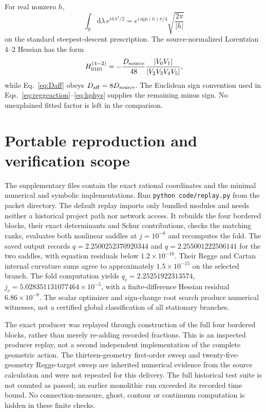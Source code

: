 \documentclass[11pt]{article}
\theoremstyle{definition}
\theoremstyle{remark}
\newcommand{\dd}{\mathrm d}
\begin{document}
For real nonzero $h$,
\begin{equation}
 \int_{\mathbb R}\dd\lambda\,e^{ih\lambda^2/2}
 =e^{i\,\mathrm{sgn}(h)\pi/4}\sqrt{\frac{2\pi}{|h|}}
\end{equation}
on the standard steepest-descent prescription.  The source-normalized Lorentzian $4$--$2$ Hessian has the form
\begin{equation}
 H_{0101}^{(4-2)}=-\frac{D_{\rm source}}{48}
 \frac{|V_0V_1|}{|V_2V_3V_4V_5|},
\end{equation}
while Eq.~\eqref{eq:Daff} obeys $D_{\rm aff}=8D_{\rm source}$.  The Euclidean sign convention used in Eqs.~\eqref{eq:reggeaction}--\eqref{eq:hphys} supplies the remaining minus sign.  No unexplained fitted factor is left in the comparison.

\section{Portable reproduction and verification scope}
The supplementary files contain the exact rational coordinates and the minimal numerical and symbolic implementations.
Run \texttt{python code/replay.py} from the packet directory.
The default replay imports only bundled modules and needs neither a historical project path nor network access.
It rebuilds the four bordered blocks, their exact determinants and Schur contributions, checks the matching ranks, evaluates both nonlinear saddles at $j=10^{-6}$ and recomputes the fold.
The saved output records $q=2.2500252370920344$ and $q=2.255001222506141$ for the two saddles, with equation residuals below $1.2\times10^{-16}$.
Their Regge and Cartan internal curvature sums agree to approximately $1.5\times10^{-15}$ on the selected branch.
The fold computation yields $q_c=2.25251922313574$, $j_c=5.028351131077464\times10^{-5}$, with a finite-difference Hessian residual $6.86\times10^{-8}$.
The scalar optimizer and sign-change root search produce numerical witnesses, not a certified global classification of all stationary branches.

The exact producer was replayed through construction of the full four bordered blocks, rather than merely re-adding recorded fractions.
This is an inspected producer replay, not a second independent implementation of the complete geometric action.
The thirteen-geometry first-order sweep and twenty-five-geometry Regge-target sweep are inherited numerical evidence from the source calculation and were not repeated for this delivery.
The full historical test suite is not counted as passed; an earlier monolithic run exceeded its recorded time bound.
No connection-measure, ghost, contour or continuum computation is hidden in these finite checks.
\end{document}
